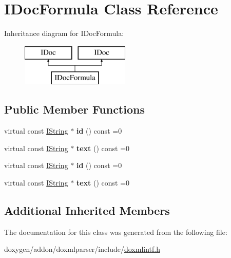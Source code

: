 \hypertarget{class_i_doc_formula}{}\section{I\+Doc\+Formula Class Reference}
\label{class_i_doc_formula}
Inheritance diagram for I\+Doc\+Formula\+:\begin{figure}[H]
\begin{center}
\leavevmode
\includegraphics[height=2.000000cm]{class_i_doc_formula}
\end{center}
\end{figure}
\subsection*{Public Member Functions}
\begin{DoxyCompactItemize}
\item 
\mbox{\label{class_i_doc_formula_ac126496bc153c10e07ebbaa2678527f2}} 
virtual const \mbox{\hyperlink{class_i_string}{I\+String}} $\ast$ {\bfseries id} () const =0
\item 
\mbox{\label{class_i_doc_formula_af1acf7b7bc4f032cdbf2d3771370d49e}} 
virtual const \mbox{\hyperlink{class_i_string}{I\+String}} $\ast$ {\bfseries text} () const =0
\item 
\mbox{\label{class_i_doc_formula_ac126496bc153c10e07ebbaa2678527f2}} 
virtual const \mbox{\hyperlink{class_i_string}{I\+String}} $\ast$ {\bfseries id} () const =0
\item 
\mbox{\label{class_i_doc_formula_af1acf7b7bc4f032cdbf2d3771370d49e}} 
virtual const \mbox{\hyperlink{class_i_string}{I\+String}} $\ast$ {\bfseries text} () const =0
\end{DoxyCompactItemize}
\subsection*{Additional Inherited Members}


The documentation for this class was generated from the following file\+:\begin{DoxyCompactItemize}
\item 
doxygen/addon/doxmlparser/include/\mbox{\hyperlink{include_2doxmlintf_8h}{doxmlintf.\+h}}\end{DoxyCompactItemize}
